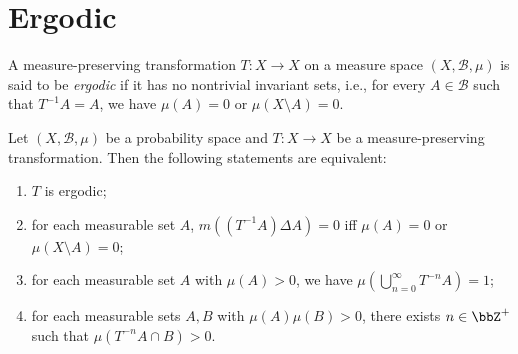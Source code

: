 \section{Ergodic}

\begin{definition}\label{def:ergodic_transformation}
        A measure-preserving transformation \(T:X\to X\) on a measure space \((X, \mathcal{B}, \mu)\) is said to be \emph{ergodic} if it has no nontrivial invariant sets, i.e., for every \(A\in \mathcal{B}\) such that \(T^{-1}A = A\), we have \(\mu(A) = 0\) or \(\mu(X\setminus A) = 0\).
        
    \end{definition}

    \begin{theorem}\label{thm:characterization_of_ergodic_transformation}
        Let \((X, \mathcal{B}, \mu)\) be a probability space and \(T:X\to X\) be a measure-preserving transformation. 
        Then the following statements are equivalent:
        \begin{enumerate}
            \item \(T\) is ergodic;
            \item for each measurable set \(A\), \(m((T^{-1}A) \Delta A) = 0\) iff \(\mu(A) = 0\) or \(\mu(X\setminus A) = 0\);
            \item for each measurable set \(A\) with \(\mu(A) > 0\), we have \(\mu\left(\bigcup_{n=0}^\infty T^{-n}A\right) = 1\);
            \item for each measurable sets \(A, B\) with \(\mu(A)\mu(B) > 0\), there exists \(n\in \bbZ^+\) such that \(\mu(T^{-n}A \cap B) > 0\).
        \end{enumerate}
    \end{theorem}


